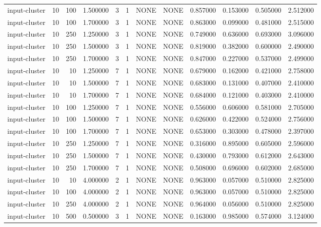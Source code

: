 \begin{tabular}{lrrrllllrrrr}
input-cluster & 10 & 100 & 1.500000 & 3 & 1 & NONE & NONE & 0.857000 & 0.153000 & 0.505000 & 2.512000 \\
input-cluster & 10 & 100 & 1.700000 & 3 & 1 & NONE & NONE & 0.863000 & 0.099000 & 0.481000 & 2.515000 \\
input-cluster & 10 & 250 & 1.250000 & 3 & 1 & NONE & NONE & 0.749000 & 0.636000 & 0.693000 & 3.096000 \\
input-cluster & 10 & 250 & 1.500000 & 3 & 1 & NONE & NONE & 0.819000 & 0.382000 & 0.600000 & 2.490000 \\
input-cluster & 10 & 250 & 1.700000 & 3 & 1 & NONE & NONE & 0.847000 & 0.227000 & 0.537000 & 2.499000 \\
input-cluster & 10 & 10 & 1.250000 & 7 & 1 & NONE & NONE & 0.679000 & 0.162000 & 0.421000 & 2.758000 \\
input-cluster & 10 & 10 & 1.500000 & 7 & 1 & NONE & NONE & 0.683000 & 0.131000 & 0.407000 & 2.410000 \\
input-cluster & 10 & 10 & 1.700000 & 7 & 1 & NONE & NONE & 0.684000 & 0.121000 & 0.403000 & 2.410000 \\
input-cluster & 10 & 100 & 1.250000 & 7 & 1 & NONE & NONE & 0.556000 & 0.606000 & 0.581000 & 2.705000 \\
input-cluster & 10 & 100 & 1.500000 & 7 & 1 & NONE & NONE & 0.626000 & 0.422000 & 0.524000 & 2.756000 \\
input-cluster & 10 & 100 & 1.700000 & 7 & 1 & NONE & NONE & 0.653000 & 0.303000 & 0.478000 & 2.397000 \\
input-cluster & 10 & 250 & 1.250000 & 7 & 1 & NONE & NONE & 0.316000 & 0.895000 & 0.605000 & 2.596000 \\
input-cluster & 10 & 250 & 1.500000 & 7 & 1 & NONE & NONE & 0.430000 & 0.793000 & 0.612000 & 2.643000 \\
input-cluster & 10 & 250 & 1.700000 & 7 & 1 & NONE & NONE & 0.508000 & 0.696000 & 0.602000 & 2.685000 \\
input-cluster & 10 & 10 & 4.000000 & 2 & 1 & NONE & NONE & 0.963000 & 0.057000 & 0.510000 & 2.825000 \\
input-cluster & 10 & 100 & 4.000000 & 2 & 1 & NONE & NONE & 0.963000 & 0.057000 & 0.510000 & 2.825000 \\
input-cluster & 10 & 250 & 4.000000 & 2 & 1 & NONE & NONE & 0.964000 & 0.056000 & 0.510000 & 2.825000 \\
input-cluster & 10 & 500 & 0.500000 & 3 & 1 & NONE & NONE & 0.163000 & 0.985000 & 0.574000 & 3.124000 \\

\end{tabular}
